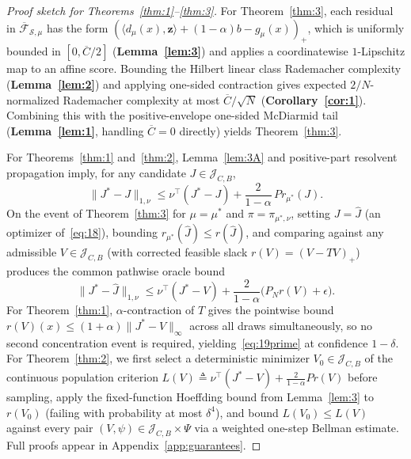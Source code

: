\documentclass[11pt,letterpaper]{article}
\newcommand{\Jclass}{\mathcal{J}_{C,B}}
\newcommand{\Cbar}{\overline{C}}
\newcommand{\occ}{\pi_{\mu^*,\nu}}
\newcommand{\ip}[2]{\langle #1, #2\rangle}
\newcommand{\norm}[1]{\lVert #1\rVert}
\newcommand{\defeq}{\triangleq}
\theoremstyle{definition}
\begin{document}
\begin{proof}[Proof sketch for Theorems~\ref{thm:1}--\ref{thm:3}]
For Theorem~\ref{thm:3}, each residual in $\overline{\mathcal{F}}_{\mathcal{S},\mu}$ has the form $(\ip{d_\mu(x)}{\mathbf{z}} + (1-\alpha)b - g_\mu(x))_+$, which is uniformly bounded in $[0,\Cbar/2]$ (\textbf{Lemma~\ref{lem:3}}) and applies a coordinatewise $1$-Lipschitz map to an affine score. Bounding the Hilbert linear class Rademacher complexity (\textbf{Lemma~\ref{lem:2}}) and applying one-sided contraction gives expected $2/N$-normalized Rademacher complexity at most $\Cbar/\sqrt{N}$ (\textbf{Corollary~\ref{cor:1}}). Combining this with the positive-envelope one-sided McDiarmid tail (\textbf{Lemma~\ref{lem:1}}, handling $\Cbar=0$ directly) yields Theorem~\ref{thm:3}.

For Theorems~\ref{thm:1} and~\ref{thm:2}, Lemma~\ref{lem:3A} and positive-part resolvent propagation imply, for any candidate $J\in\Jclass$,
\[
 \norm{J^* - J}_{1,\nu} \le \nu^\top(J^* - J) + \frac{2}{1-\alpha}\, P r_{\mu^*}(J).
\]
On the event of Theorem~\ref{thm:3} for $\mu=\mu^*$ and $\pi=\occ$, setting $J=\widehat{J}$ (an optimizer of~\eqref{eq:18}), bounding $r_{\mu^*}(\widehat{J}) \le r(\widehat{J})$, and comparing against any admissible $V\in\Jclass$ (with corrected feasible slack $r(V) = (V-TV)_+$) produces the common pathwise oracle bound
\[
 \norm{J^* - \widehat{J}}_{1,\nu} \le \nu^\top(J^* - V) + \frac{2}{1-\alpha}\bigl(P_N r(V) + \epsilon\bigr).
\]
For Theorem~\ref{thm:1}, $\alpha$-contraction of $T$ gives the pointwise bound $r(V)(x) \le (1+\alpha)\norm{J^*-V}_\infty$ across all draws simultaneously, so no second concentration event is required, yielding~\eqref{eq:19prime} at confidence $1-\delta$. For Theorem~\ref{thm:2}, we first select a deterministic minimizer $V_0\in\Jclass$ of the continuous population criterion $L(V) \defeq \nu^\top(J^*-V) + \frac{2}{1-\alpha} P r(V)$ before sampling, apply the fixed-function Hoeffding bound from Lemma~\ref{lem:3} to $r(V_0)$ (failing with probability at most $\delta^4$), and bound $L(V_0) \le L(V)$ against every pair $(V,\psi)\in\Jclass\times\Psi$ via a weighted one-step Bellman estimate. Full proofs appear in Appendix~\ref{app:guarantees}.
\end{proof}
\end{document}
